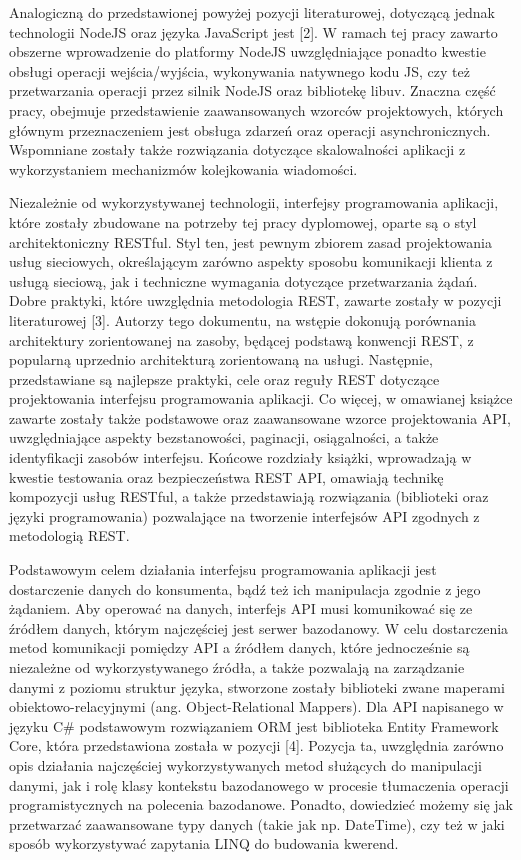 Analogiczną do przedstawionej powyżej pozycji literaturowej, dotyczącą jednak technologii NodeJS oraz języka JavaScript jest [2]. W ramach tej pracy zawarto obszerne wprowadzenie do platformy NodeJS uwzględniające ponadto kwestie obsługi operacji wejścia/wyjścia, wykonywania natywnego kodu JS, czy też przetwarzania operacji przez silnik NodeJS oraz bibliotekę libuv. Znaczna część pracy, obejmuje przedstawienie zaawansowanych wzorców projektowych, których głównym przeznaczeniem jest obsługa zdarzeń oraz operacji asynchronicznych. Wspomniane zostały także rozwiązania dotyczące skalowalności aplikacji z wykorzystaniem mechanizmów kolejkowania wiadomości.

Niezależnie od wykorzystywanej technologii, interfejsy programowania aplikacji, które zostały zbudowane na potrzeby tej pracy dyplomowej, oparte są o styl architektoniczny RESTful. Styl ten, jest pewnym zbiorem zasad projektowania usług sieciowych, określającym zarówno aspekty sposobu komunikacji klienta z usługą sieciową, jak i techniczne wymagania dotyczące przetwarzania żądań. Dobre praktyki, które uwzględnia metodologia REST, zawarte zostały w pozycji literaturowej [3]. Autorzy tego dokumentu, na wstępie dokonują porównania architektury zorientowanej na zasoby, będącej podstawą konwencji REST, z popularną uprzednio architekturą zorientowaną na usługi. Następnie, przedstawiane są najlepsze praktyki, cele oraz reguły REST dotyczące projektowania interfejsu programowania aplikacji. Co więcej, w omawianej książce zawarte zostały także podstawowe oraz zaawansowane wzorce projektowania API, uwzględniające aspekty bezstanowości, paginacji, osiągalności, a także identyfikacji zasobów interfejsu. Końcowe rozdziały książki, wprowadzają w kwestie testowania oraz bezpieczeństwa REST API, omawiają technikę kompozycji usług RESTful, a także przedstawiają rozwiązania (biblioteki oraz języki programowania) pozwalające na tworzenie interfejsów API zgodnych z metodologią REST.

Podstawowym celem działania interfejsu programowania aplikacji jest dostarczenie danych do konsumenta, bądź też ich manipulacja zgodnie z jego żądaniem. Aby operować na danych, interfejs API musi komunikować się ze źródłem danych, którym najczęściej jest serwer bazodanowy. W celu dostarczenia metod komunikacji pomiędzy API a źródłem danych, które jednocześnie są niezależne od wykorzystywanego źródła, a także pozwalają na zarządzanie danymi z poziomu struktur języka, stworzone zostały biblioteki zwane maperami obiektowo-relacyjnymi (ang. Object-Relational Mappers). Dla API napisanego w języku C\# podstawowym rozwiązaniem ORM jest biblioteka Entity Framework Core, która przedstawiona została w pozycji [4]. Pozycja ta, uwzględnia zarówno opis działania najczęściej wykorzystywanych metod służących do manipulacji danymi, jak i rolę klasy kontekstu bazodanowego w procesie tłumaczenia operacji programistycznych na polecenia bazodanowe. Ponadto, dowiedzieć możemy się jak przetwarzać zaawansowane typy danych (takie jak np. DateTime), czy też w jaki sposób wykorzystywać zapytania LINQ do budowania kwerend.

